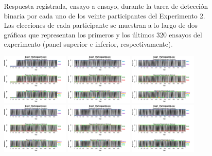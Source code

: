 \begin{figure}[th]
\caption[Respuesta binaria registrada ensayo a ensayo; Experimento 2]{Respuesta registrada, ensayo a ensayo, durante la tarea de detección binaria por cada uno de los veinte participantes del Experimento 2. Las elecciones de cada participante se muestran a lo largo de dos gráficas que representan los primeros y los últimos 320 ensayos del experimento (panel superior e inferior, respectivamente).}
\label{fig:Response_E2}
\end{figure}

\begin{figure}[th]
\centering
\includegraphics[width=0.30\textwidth]{Figures/BiasResp_Exp1_P1} \includegraphics[width=0.30\textwidth]{Figures/BiasResp_Exp1_P2} \includegraphics[width=0.30\textwidth]{Figures/BiasResp_Exp1_P3}
\includegraphics[width=0.30\textwidth]{Figures/BiasResp_Exp1_P4} \includegraphics[width=0.30\textwidth]{Figures/BiasResp_Exp1_P5} \includegraphics[width=0.30\textwidth]{Figures/BiasResp_Exp1_P6}

\end{figure}
